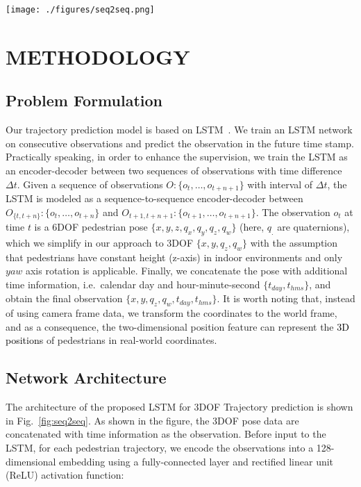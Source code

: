 \documentclass[letterpaper, 10 pt, conference]{ieeeconf}  %
\newcommand\kevinupdate[1]{\textcolor{black}{#1}}
\begin{document}
\begin{figure*}[t]
\centering
\texttt{[image: ./figures/seq2seq.png]}
\caption{The architecture of our Temporal Pose-LSTM network. A shared-triple-layer LSTM is trained in a sequence-to-sequence encoder-decoder form.  }
\label{fig:seq2seq}
\end{figure*}

\section{METHODOLOGY}
\label{sec:methodology}

\subsection{Problem Formulation}
Our trajectory prediction model is based on LSTM~\cite{lstm}.
We train an LSTM network on consecutive observations and predict the observation in the future time stamp.
Practically speaking, in order to enhance the supervision, we train the LSTM as an encoder-decoder between two sequences of observations with time difference $\Delta t$.
Given a sequence of observations $O:\{o_t, \dots, o_{t+n+1}\}$ with interval of $\Delta t$, the LSTM is modeled as a sequence-to-sequence encoder-decoder between $O_{\{t, t+n\}}:\{o_t, \dots, o_{t+n}\}$ and $O_{t+1, t+n+1}:\{o_{t+1}, \dots, o_{t+n+1}\}$.
The observation $o_t$ at time $t$ is a 6DOF pedestrian pose $\{x, y, z, q_x, q_y, q_z, q_w\}$ (here, $q_{.}$ are quaternions), which we simplify in our approach to 3DOF $\{x, y, q_z, q_w\}$ with the assumption that pedestrians have constant height (z-axis) in indoor environments and only $yaw$ axis rotation is applicable.
Finally, we concatenate the pose with additional time information, i.e.\ calendar day and hour-minute-second $\{t_{day}, t_{hms}\}$, and obtain the final observation $\{x, y, q_z, q_w, t_{day}, t_{hms}\}$.
It is worth noting that, instead of using camera frame data, we transform the coordinates to the world frame, and as a consequence, the two-dimensional position feature can represent the \kevinupdate{3D positions} of pedestrians in real-world coordinates.

\subsection{Network Architecture}
The architecture of the proposed LSTM for 3DOF Trajectory prediction is shown in Fig.~\ref{fig:seq2seq}. As shown in the figure, the 3DOF pose data are concatenated with time information as the observation. Before input to the LSTM, for each pedestrian trajectory, we encode the observations into a 128-dimensional embedding using a fully-connected layer and rectified linear unit (ReLU) activation function:
\end{document}
